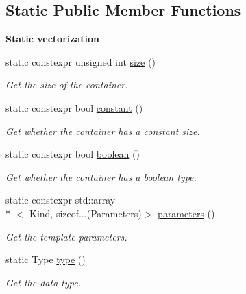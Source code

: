 \subsection*{Static Public Member Functions}
\begin{Indent}{\bf Static vectorization}\par
\begin{DoxyCompactItemize}
\item 
static constexpr unsigned int \hyperlink{classmagrathea_1_1StaticVectorizer_a6fe290c124a079e831805e7272cef4e9}{size} ()
\begin{DoxyCompactList}\small\item\em Get the size of the container. \end{DoxyCompactList}\item 
static constexpr bool \hyperlink{classmagrathea_1_1StaticVectorizer_a6fd144433ff6622ecc6de294e63ebdd9}{constant} ()
\begin{DoxyCompactList}\small\item\em Get whether the container has a constant size. \end{DoxyCompactList}\item 
static constexpr bool \hyperlink{classmagrathea_1_1StaticVectorizer_a697a4f8ce9376695ed71dd1ca89cdd75}{boolean} ()
\begin{DoxyCompactList}\small\item\em Get whether the container has a boolean type. \end{DoxyCompactList}\item 
static constexpr std\-::array\\*
$<$ Kind, sizeof...(Parameters)$>$ \hyperlink{classmagrathea_1_1StaticVectorizer_a92fa50efed3f2e5175472ece1aaf8ae5}{parameters} ()
\begin{DoxyCompactList}\small\item\em Get the template parameters. \end{DoxyCompactList}\item 
static Type \hyperlink{classmagrathea_1_1StaticVectorizer_a28c393a3896a3e839008c35d56b10a54}{type} ()
\begin{DoxyCompactList}\small\item\em Get the data type. \end{DoxyCompactList}\end{DoxyCompactItemize}
\end{Indent}
